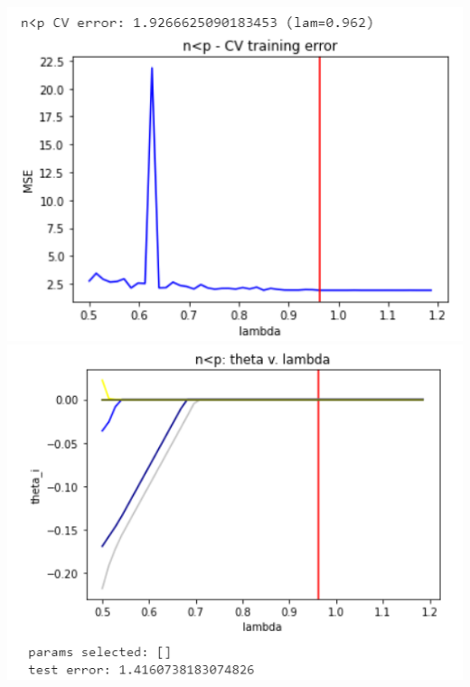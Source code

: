 \documentclass[11pt]{article}
\begin{document}
\begin{center}
\includegraphics[scale=0.7]{charts/lasso_corr_n_lt_p_err.PNG}
\includegraphics[scale=0.7]{charts/lasso_corr_n_lt_p_thetas.PNG}


\end{center}
\end{document}
